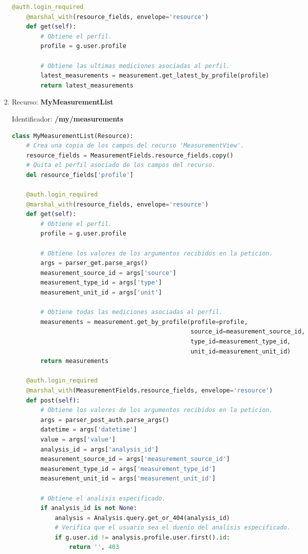 \begin{enumerate}
\begin{lstlisting}[language=Python]
    @auth.login_required
    @marshal_with(resource_fields, envelope='resource')
    def get(self):
        # Obtiene el perfil.
        profile = g.user.profile

        # Obtiene las ultimas mediciones asociadas al perfil.
        latest_measurements = measurement.get_latest_by_profile(profile)
        return latest_measurements
\end{lstlisting}

\item Recurso: \textbf{MyMeasurementList}

Identificador: \textbf{/my/measurements}

\begin{lstlisting}[language=Python]
class MyMeasurementList(Resource):
    # Crea una copia de los campos del recurso 'MeasurementView'.
    resource_fields = MeasurementFields.resource_fields.copy()
    # Quita el perfil asociado de los campos del recurso.
    del resource_fields['profile']

    @auth.login_required
    @marshal_with(resource_fields, envelope='resource')
    def get(self):
        # Obtiene el perfil.
        profile = g.user.profile

        # Obtiene los valores de los argumentos recibidos en la peticion.
        args = parser_get.parse_args()
        measurement_source_id = args['source']
        measurement_type_id = args['type']
        measurement_unit_id = args['unit']

        # Obtiene todas las mediciones asociadas al perfil.
        measurements = measurement.get_by_profile(profile=profile,
                                                  source_id=measurement_source_id,
                                                  type_id=measurement_type_id,
                                                  unit_id=measurement_unit_id)
        return measurements

    @auth.login_required
    @marshal_with(MeasurementFields.resource_fields, envelope='resource')
    def post(self):
        # Obtiene los valores de los argumentos recibidos en la peticion.
        args = parser_post_auth.parse_args()
        datetime = args['datetime']
        value = args['value']
        analysis_id = args['analysis_id']
        measurement_source_id = args['measurement_source_id']
        measurement_type_id = args['measurement_type_id']
        measurement_unit_id = args['measurement_unit_id']

        # Obtiene el analisis especificado.
        if analysis_id is not None:
            analysis = Analysis.query.get_or_404(analysis_id)
            # Verifica que el usuario sea el duenio del analisis especificado.
            if g.user.id != analysis.profile.user.first().id:
                return '', 403


\end{lstlisting}
\end{enumerate}
